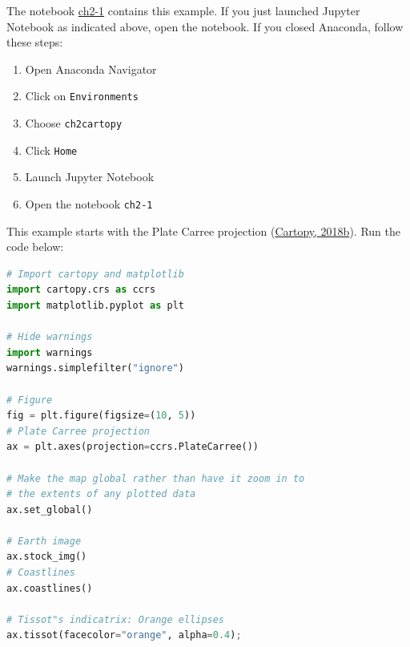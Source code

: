 \documentclass[a4paper , 12pt]{book}
\newcommand{\code}[1]{\colorbox{light-gray}{\texttt{#1}}}
\begin{document}
The notebook \href{https://github.com/nfcd/compGeo/blob/master/source/notebooks/ch2-1.ipynb}{ch2-1} contains this example. If you just launched Jupyter Notebook as indicated above, open the notebook. If you closed Anaconda, follow these steps:

\begin{enumerate}
    \item Open Anaconda Navigator
    \item Click on \code{Environments}
    \item Choose \code{ch2cartopy}
    \item Click \code{Home}
    \item Launch Jupyter Notebook
    \item Open the notebook \code{ch2-1}
\end{enumerate}{}

This example starts with the Plate Carree projection (\href{https://scitools.org.uk/cartopy/docs/latest/gallery/tissot.html}{Cartopy, 2018b}). Run the code below:

\begin{center}
\begin{lstlisting}[language=Python, frame=single]
# Import cartopy and matplotlib
import cartopy.crs as ccrs
import matplotlib.pyplot as plt

# Hide warnings
import warnings 
warnings.simplefilter("ignore")

# Figure
fig = plt.figure(figsize=(10, 5))
# Plate Carree projection
ax = plt.axes(projection=ccrs.PlateCarree())

# Make the map global rather than have it zoom in to
# the extents of any plotted data
ax.set_global()

# Earth image
ax.stock_img()
# Coastlines
ax.coastlines()

# Tissot"s indicatrix: Orange ellipses
ax.tissot(facecolor="orange", alpha=0.4);
\end{lstlisting}
\end{center}
\end{document}
